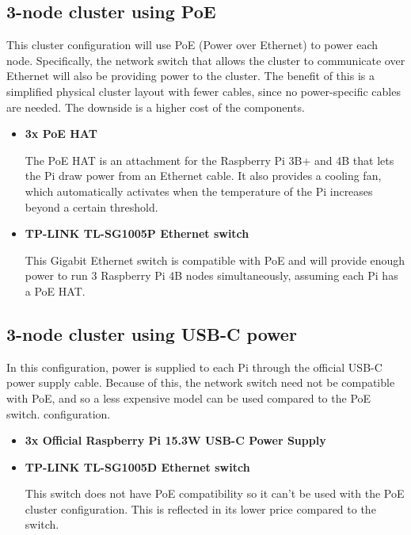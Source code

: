 \documentclass{article}
\begin{document}
\subsection{3-node cluster using PoE}

This cluster configuration will use PoE (Power over Ethernet) to power each node. Specifically, the network switch that allows the cluster to communicate over Ethernet will also be providing power to the cluster. The benefit of this is a simplified physical cluster layout with fewer cables, since no power-specific cables are needed. The downside is a higher cost of the components.

\begin{itemize}
    \item \textbf{3x PoE HAT}
        
    The PoE HAT is an attachment for the Raspberry Pi 3B+ and 4B that lets the Pi draw power from an Ethernet cable. It also provides a cooling fan, which automatically activates when the temperature of the Pi increases beyond a certain threshold.
    
    \item \textbf{TP-LINK TL-SG1005P Ethernet switch}
    
    This Gigabit Ethernet switch is compatible with PoE and will provide enough power to run $3$ Raspberry Pi 4B nodes simultaneously, assuming each Pi has a PoE HAT.
\end{itemize}

\subsection{3-node cluster using USB-C power}

In this configuration, power is supplied to each Pi through the official USB-C power supply cable. Because of this, the network switch need not be compatible with PoE, and so a less expensive model can be used compared to the PoE switch. configuration.

\begin{itemize}
    \item \textbf{3x Official Raspberry Pi 15.3W USB-C Power Supply}
    
    \item \textbf{TP-LINK TL-SG1005D Ethernet switch}
    
    This switch does not have PoE compatibility so it can't be used with the PoE cluster configuration. This is reflected in its lower price compared to the switch.
\end{itemize}
\end{document}
